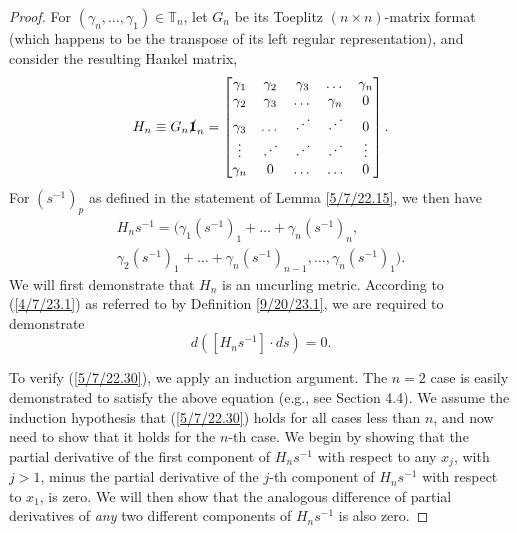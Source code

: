 \documentclass{amsart}
\numberwithin{equation}{section}
\theoremstyle{definition}
\numberwithin{theorem}{section}
\begin{document}
\begin{proof}  For $(\gamma_n,\dots,\gamma_1)\in \mathbb{T}_n$, let $G_n$ be its Toeplitz $(n\times n)$-matrix format (which happens to be the transpose of its left regular representation), and consider the resulting Hankel matrix, 
\begin{equation}\label{5/7/22.20} H_n \equiv G_n \slashed{\bf 1}_n = \begin{bmatrix} \gamma_1 & \gamma_2 & \gamma_3 & \dots & \gamma_n \\ \gamma_2 & \gamma_3 & \dots & \gamma_n & 0 \\ \gamma_3 & \dots & \iddots & \iddots & 0  \\ \vdots & \iddots & \iddots & \iddots & \vdots \\ \gamma_n & 0 & \dots & \ldots & 0 \end{bmatrix}.\end{equation}
For $\left( s^{-1} \right)_p$ as defined in the statement of Lemma \ref{5/7/22.15}, we then have
\begin{multline}  H_n s^{-1}   =  \Big( \gamma_1\left( s^{-1} \right)_1  + \dots + \gamma_n \left( s^{-1} \right)_n, \\ \gamma_2\left( s^{-1} \right)_1  + \dots + \gamma_n \left( s^{-1} \right)_{n-1}, 
  \dots , 
 \gamma_n \left( s^{-1} \right)_1 \Big). \label{5/7/22.40}
\end{multline}
 We will first demonstrate that $H_n$ is an uncurling metric.  According to (\ref{4/7/23.1}) as referred to by Definition \ref{9/20/23.1}, we are required to demonstrate \enlargethispage{.8cm}
\begin{equation}\label{5/7/22.30} d\left([H_n s^{-1}]\cdot ds\right) = 0.\end{equation}  

To verify (\ref{5/7/22.30}), we apply an induction argument.  The $n=2$ case is easily demonstrated to satisfy the above equation (e.g., see Section 4.4).  We assume the induction hypothesis that (\ref{5/7/22.30}) holds for all cases less than $n$, and now need to show that it holds for the $n$-th case.  
We begin by showing that the partial derivative of the first component of $H_n s^{-1}$ with respect to any $x_j$, with $j>1$, minus the partial derivative of the $j$-th component of $H_n s^{-1}$ with respect to $x_1$, is zero. We will then show that the analogous difference of partial derivatives of {\it any} two different components of $H_ns^{-1}$ is also zero.


\end{proof}
\end{document}
